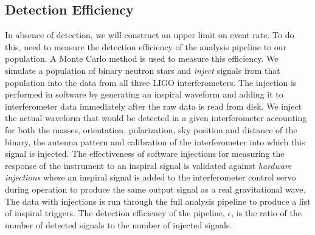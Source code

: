 \subsection{Detection Efficiency}
\label{ss:eff}

In absence of detection, we will construct an upper limit on event rate.  To
do this, need to measure the detection efficiency of the analysis pipeline to
our population. A Monte Carlo method is used to measure this efficiency. We
simulate a population of binary neutron stars and \emph{inject} signals from
that population into the data from all three LIGO interferometers. The
injection is performed in software by generating an inspiral waveform and
adding it to interferometer data immediately after the raw data is read from
disk. We inject the actual waveform that would be detected in a given
interferometer accounting for both the masses, orientation, polarization, sky
position and distance of the binary, the antenna pattern and calibration of
the interferometer into which this signal is injected.  The effectiveness of
software injections for measuring the response of the instrument to an
inspiral signal is validated against \emph{hardware injections}\cite{hw} where
an inspiral signal is added to the interferometer control servo during
operation to produce the same output signal as a real gravitational wave.  The
data with injections is run through the full analysis pipeline to produce a
list of inspiral triggers. The detection efficiency of the pipeline,
$\epsilon$, is the ratio of the number of detected signals to the number of
injected signals.
